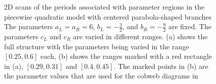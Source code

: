 \begin{figure}
	\centering
	\caption[2D scans of the periods associated with parameter regions in the piecewise quadratic model with centered parabola-shaped branches]{
		2D scans of the periods associated with parameter regions in the piecewise quadratic model with centered parabola-shaped branches
		The parameters $a_L = a_R = 6$, $b_L = -\frac{3}{2}$, and $b_R = -\frac{9}{2}$ are fixed.
		The parameters $c_L$ and $c_R$ are varied in different ranges.
		(a) shows the full structure with the parameters being varied in the range $[0.25, 0.6]$ each,
		(b) shows the ranges marked with a red rectangle in (a), $[0.29, 0.31]$ and $[0.4, 0.45]$.
		The marked points in (b) are the parameter values that are used for the cobweb diagrams in 
	}
\end{figure}

